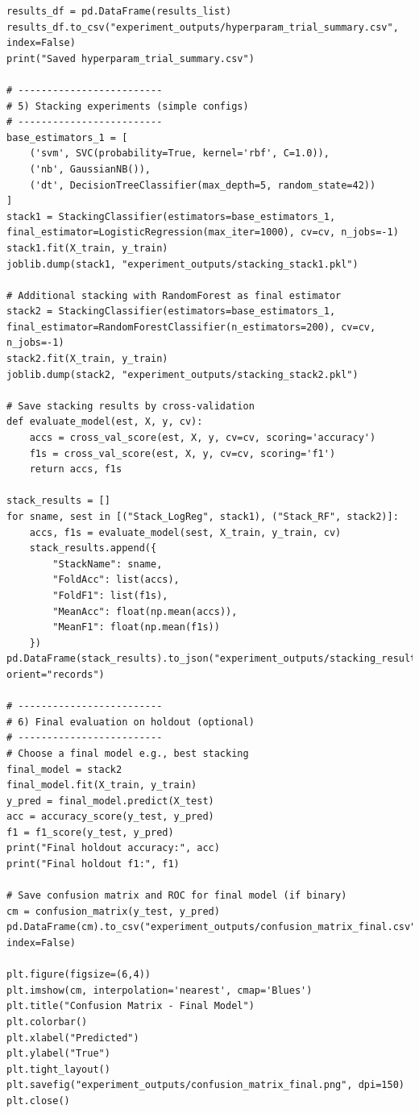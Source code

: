 \documentclass[11pt]{article}
\begin{document}
\begin{lstlisting}
results_df = pd.DataFrame(results_list)
results_df.to_csv("experiment_outputs/hyperparam_trial_summary.csv", index=False)
print("Saved hyperparam_trial_summary.csv")

# -------------------------
# 5) Stacking experiments (simple configs)
# -------------------------
base_estimators_1 = [
    ('svm', SVC(probability=True, kernel='rbf', C=1.0)),
    ('nb', GaussianNB()),
    ('dt', DecisionTreeClassifier(max_depth=5, random_state=42))
]
stack1 = StackingClassifier(estimators=base_estimators_1, final_estimator=LogisticRegression(max_iter=1000), cv=cv, n_jobs=-1)
stack1.fit(X_train, y_train)
joblib.dump(stack1, "experiment_outputs/stacking_stack1.pkl")

# Additional stacking with RandomForest as final estimator
stack2 = StackingClassifier(estimators=base_estimators_1, final_estimator=RandomForestClassifier(n_estimators=200), cv=cv, n_jobs=-1)
stack2.fit(X_train, y_train)
joblib.dump(stack2, "experiment_outputs/stacking_stack2.pkl")

# Save stacking results by cross-validation
def evaluate_model(est, X, y, cv):
    accs = cross_val_score(est, X, y, cv=cv, scoring='accuracy')
    f1s = cross_val_score(est, X, y, cv=cv, scoring='f1')
    return accs, f1s

stack_results = []
for sname, sest in [("Stack_LogReg", stack1), ("Stack_RF", stack2)]:
    accs, f1s = evaluate_model(sest, X_train, y_train, cv)
    stack_results.append({
        "StackName": sname,
        "FoldAcc": list(accs),
        "FoldF1": list(f1s),
        "MeanAcc": float(np.mean(accs)),
        "MeanF1": float(np.mean(f1s))
    })
pd.DataFrame(stack_results).to_json("experiment_outputs/stacking_results.json", orient="records")

# -------------------------
# 6) Final evaluation on holdout (optional)
# -------------------------
# Choose a final model e.g., best stacking
final_model = stack2
final_model.fit(X_train, y_train)
y_pred = final_model.predict(X_test)
acc = accuracy_score(y_test, y_pred)
f1 = f1_score(y_test, y_pred)
print("Final holdout accuracy:", acc)
print("Final holdout f1:", f1)

# Save confusion matrix and ROC for final model (if binary)
cm = confusion_matrix(y_test, y_pred)
pd.DataFrame(cm).to_csv("experiment_outputs/confusion_matrix_final.csv", index=False)

plt.figure(figsize=(6,4))
plt.imshow(cm, interpolation='nearest', cmap='Blues')
plt.title("Confusion Matrix - Final Model")
plt.colorbar()
plt.xlabel("Predicted")
plt.ylabel("True")
plt.tight_layout()
plt.savefig("experiment_outputs/confusion_matrix_final.png", dpi=150)
plt.close()


\end{lstlisting}
\end{document}
